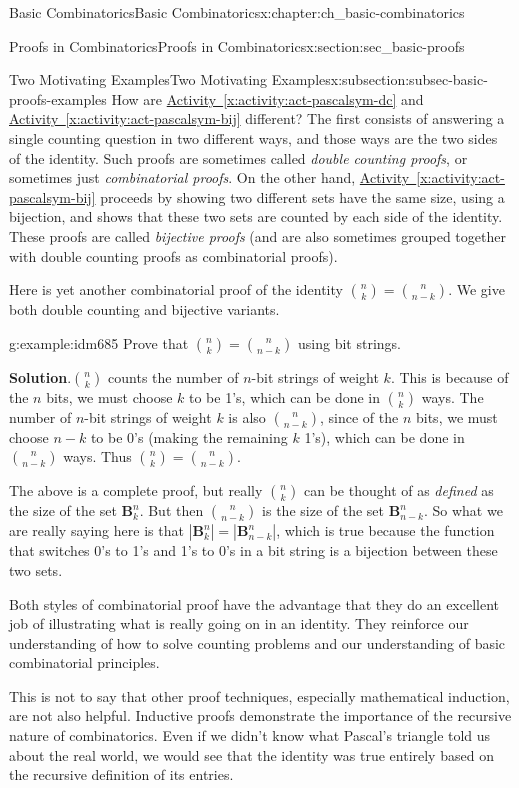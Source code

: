 \documentclass[oneside,10pt,]{book}
\numberwithin{equation}{chapter}
\def\B{\mathbf{B}}
\begin{document}
\begin{chapterptx}{Basic Combinatorics}{}{Basic Combinatorics}{}{}{x:chapter:ch_basic-combinatorics}
\begin{sectionptx}{Proofs in Combinatorics}{}{Proofs in Combinatorics}{}{}{x:section:sec_basic-proofs}
\begin{subsectionptx}{Two Motivating Examples}{}{Two Motivating Examples}{}{}{x:subsection:subsec-basic-proofs-examples}
How are \hyperref[x:activity:act-pascalsym-dc]{Activity~\ref{x:activity:act-pascalsym-dc}} and \hyperref[x:activity:act-pascalsym-bij]{Activity~\ref{x:activity:act-pascalsym-bij}} different?  The first consists of answering a single counting question in two different ways, and those ways are the two sides of the identity.  Such proofs are sometimes called \emph{double counting proofs}, or sometimes just \emph{combinatorial proofs}.  On the other hand, \hyperref[x:activity:act-pascalsym-bij]{Activity~\ref{x:activity:act-pascalsym-bij}} proceeds by showing two different sets have the same size, using a bijection, and shows that these two sets are counted by each side of the identity.  These proofs are called \emph{bijective proofs} (and are also sometimes grouped together with double counting proofs as combinatorial proofs).%
\par
Here is yet another combinatorial proof of the identity \(\binom{n}{k} = \binom{n}{n-k}\).  We give both double counting and bijective variants.%
\begin{example}{}{g:example:idm685}%
Prove that \(\binom{n}{k} = \binom{n}{n-k}\) using bit strings.%
\par\smallskip%
\noindent\textbf{Solution}.\hypertarget{g:solution:idm689}{}\quad{}\(\binom{n}{k}\) counts the number of \(n\)-bit strings of weight \(k\).  This is because of the \(n\) bits, we must choose \(k\) to be 1's, which can be done in \(\binom{n}{k}\) ways.  The number of \(n\)-bit strings of weight \(k\) is also \(\binom{n}{n-k}\), since of the \(n\) bits, we must choose \(n-k\) to be 0's (making the remaining \(k\) 1's), which can be done in \(\binom{n}{n-k}\) ways.  Thus \(\binom{n}{k} = \binom{n}{n-k}\).%
\par
The above is a complete proof, but really \(\binom{n}{k}\) can be thought of as \emph{defined} as the size of the set \(\B^n_k\).  But then \(\binom{n}{n-k}\) is the size of the set \(\B^n_{n-k}\).  So what we are really saying here is that \(|\B^n_k| = |\B^n_{n-k}|\), which is true because the function that switches 0's to 1's and 1's to 0's in a bit string is a bijection between these two sets.%
\end{example}
Both styles of combinatorial proof have the advantage that they do an excellent job of illustrating what is really going on in an identity.  They reinforce our understanding of how to solve counting problems and our understanding of basic combinatorial principles.%
\par
This is not to say that other proof techniques, especially mathematical induction, are not also helpful.  Inductive proofs demonstrate the importance of the recursive nature of combinatorics.  Even if we didn't know what Pascal's triangle told us about the real world, we would see that the identity was true entirely based on the recursive definition of its entries.%

\end{subsectionptx}
\end{sectionptx}
\end{chapterptx}
\end{document}
